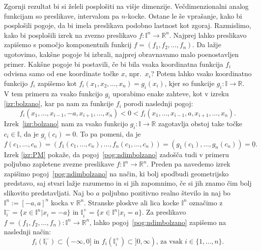 \documentclass[mat1]{fmfdelo}
\newcommand{\R}{\mathbb R}
\newcommand{\I}{\mathbb I}
\newcommand{\0}{\underline{0}}
\begin{document}
Zgornji rezultat bi si želeli posplošiti na višje dimenzije. Večdimenzionalni analog funkcijam so preslikave, intervalom pa $n$-kocke. Ostane le še vprašanje, kako bi posplošili pogoje, da bi imela preslikava podobno lastnost kot zgoraj. Razmislimo, kako bi posplošili izrek na zvezno preslikavo $f : \I^n \to \R^n$. Najprej lahko preslikavo zapišemo s pomočjo komponentnih funkcij $f = (f_1, f_2, \dots, f_n)$. Da lažje ugotovimo, kakšne pogoje bi izbrali, najprej obravnavamo malo poenostavljen primer. Kakšne pogoje bi postavili, če bi bila vsaka koordinatna funkcija $f_i$ odvisna samo od ene koordinate točke $x$, npr.\ $x_i$? Potem lahko vsako koordinatno funkcijo $f_i$ zapišemo kot $f_i(x_1, x_2, \dots, x_n) = g_i(x_i)$, kjer so funkcije $g_i : \I \to \R$. V tem primeru za vsako funkcijo $g_i$ uporabimo enake zahteve, kot v izreku \ref{izr:bolzano}, kar pa nam za funkcije $f_i$ porodi naslednji pogoj: 
\begin{equation}\label{pog:ndimbolzano}
f_i(x_1, \dots, x_{i-1}, -a, x_{i+1}, \dots, x_n) < 0 < f_i(x_1, \dots, x_{i-1}, a, x_{i+1}, \dots, x_n).
\end{equation}
Izrek~\ref{izr:bolzano} nam za vsako funkcijo $g_i : \I \to \R$ zagotavlja obstoj take točke $c_i \in \I$, da je $g_i(c_i) = 0$. To pa pomeni, da je
$$f(c_1, \dots, c_n) = (f_1(c_1, \dots, c_n), \dots, f_n(c_1, \dots, c_n)) = (g_1(c_1), \dots, g_n(c_n)) = \0.$$
Izrek \ref{izr:PM} pokaže, da pogoj~\eqref{pog:ndimbolzano} zadošča tudi v primeru poljubno zapletene zvezne preslikave $f : \I^n \to \R^n$. Preden pa navedemo izrek zapišimo pogoj~\eqref{pog:ndimbolzano} na način, ki bolj spodbudi geometrijsko predstavo, saj stvari lažje razumemo in si jih zapomnimo, če si jih znamo čim bolj slikovito predstavljati.
Naj bo $a$ poljubno pozitivno realno število in naj bo $\I^n := [-a, a]^n$ kocka v $\R^n$. Stranske ploskve ali lica kocke $\I^n$ označimo z $\I_i^- = \{x\in \I^n | x_i = -a\}$ in $\I_i^+ = \{x\in \I^n | x_i = a\}.$ Za preslikavo $f = (f_1, f_2, \dots, f_n) : \I^n \to \R^n$, lahko pogoj~\eqref{pog:ndimbolzano} zapišemo na naslednji način:
\begin{equation}\label{pog:PM}
f_i(\I_i^-) \subset (- \infty, 0]  \text{ in } f_i(\I_i^+) \subset ]0, \infty) \text{, za vsak } i \in  \{1, \dots, n\}.
\end{equation}

\end{document}

